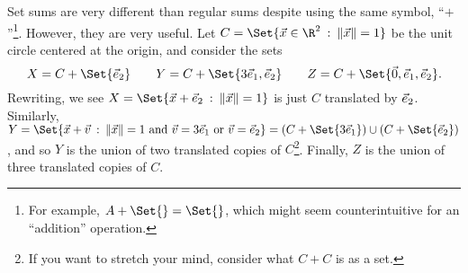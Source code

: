 
Set sums are very different than regular sums despite using the same symbol, ``$+$''\footnote{
For example, $A+\Set{}=\Set{}$, which might seem counterintuitive for an ``addition'' operation.
}.
 However, they are very useful.
Let $C=\Set{\vec x\in\R^2\given \norm{\vec x}=1}$ be the unit circle centered at the origin, and consider
the sets
\[
	X=C+\Set{\yhat}\qquad Y=C+\Set{3\xhat,\yhat}\qquad Z=C+\Set{\vec 0, \xhat,\yhat}.
\]
Rewriting, we see $X=\Set{\vec x+\yhat\given \norm{\vec x}=1}$ is just $C$ translated
by ${\vec e_2}$. Similarly, $Y=\Set{\vec x+\vec v\given \norm{\vec x}=1\text{ and }\vec v=3\xhat\text{
	or }\vec v=\yhat}=(C+\Set{3\xhat})\cup (C+\Set{\yhat})$, and so $Y$ is the union
of two translated copies of $C$\footnote{ If you want to stretch your mind, consider what $C+C$
is as a set.}. Finally, $Z$ is the union of three translated copies of $C$.

